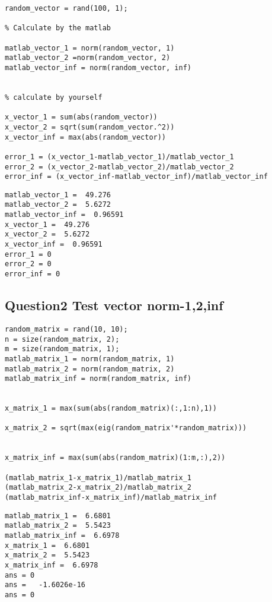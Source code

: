 \documentclass[10pt]{article}
\begin{document}
\begin{lstlisting}
random_vector = rand(100, 1);

% Calculate by the matlab

matlab_vector_1 = norm(random_vector, 1)
matlab_vector_2 =norm(random_vector, 2)
matlab_vector_inf = norm(random_vector, inf)


% calculate by yourself

x_vector_1 = sum(abs(random_vector))
x_vector_2 = sqrt(sum(random_vector.^2))
x_vector_inf = max(abs(random_vector))

error_1 = (x_vector_1-matlab_vector_1)/matlab_vector_1
error_2 = (x_vector_2-matlab_vector_2)/matlab_vector_2
error_inf = (x_vector_inf-matlab_vector_inf)/matlab_vector_inf
\end{lstlisting}
\begin{lstlisting}[language={},xleftmargin=5pt,frame=none]
matlab_vector_1 =  49.276
matlab_vector_2 =  5.6272
matlab_vector_inf =  0.96591
x_vector_1 =  49.276
x_vector_2 =  5.6272
x_vector_inf =  0.96591
error_1 = 0
error_2 = 0
error_inf = 0

\end{lstlisting}


{}
\subsection*{Question2 Test vector norm-1,2,inf}

\begin{lstlisting}
random_matrix = rand(10, 10);
n = size(random_matrix, 2);
m = size(random_matrix, 1);
matlab_matrix_1 = norm(random_matrix, 1)
matlab_matrix_2 = norm(random_matrix, 2)
matlab_matrix_inf = norm(random_matrix, inf)


x_matrix_1 = max(sum(abs(random_matrix)(:,1:n),1))

x_matrix_2 = sqrt(max(eig(random_matrix'*random_matrix)))


x_matrix_inf = max(sum(abs(random_matrix)(1:m,:),2))

(matlab_matrix_1-x_matrix_1)/matlab_matrix_1
(matlab_matrix_2-x_matrix_2)/matlab_matrix_2
(matlab_matrix_inf-x_matrix_inf)/matlab_matrix_inf
\end{lstlisting}
\begin{lstlisting}[language={},xleftmargin=5pt,frame=none]
matlab_matrix_1 =  6.6801
matlab_matrix_2 =  5.5423
matlab_matrix_inf =  6.6978
x_matrix_1 =  6.6801
x_matrix_2 =  5.5423
x_matrix_inf =  6.6978
ans = 0
ans =   -1.6026e-16
ans = 0

\end{lstlisting}
\end{document}
